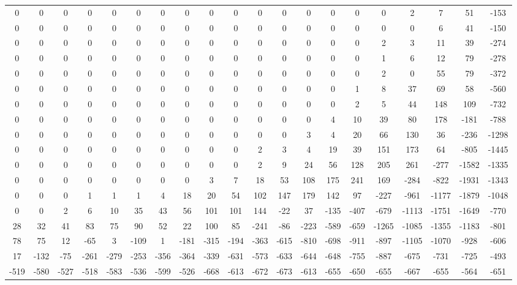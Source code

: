  \begin{tabular}{ | * {20}{c} | } 
0 & 0 & 0 & 0 & 0 & 0 & 0 & 0 & 0 & 0 & 0 & 0 & 0 & 0 & 0 & 0 & 2 & 7 & 51 & -153 \\ 
0 & 0 & 0 & 0 & 0 & 0 & 0 & 0 & 0 & 0 & 0 & 0 & 0 & 0 & 0 & 0 & 0 & 6 & 41 & -150 \\ 
0 & 0 & 0 & 0 & 0 & 0 & 0 & 0 & 0 & 0 & 0 & 0 & 0 & 0 & 0 & 2 & 3 & 11 & 39 & -274 \\ 
0 & 0 & 0 & 0 & 0 & 0 & 0 & 0 & 0 & 0 & 0 & 0 & 0 & 0 & 0 & 1 & 6 & 12 & 79 & -278 \\ 
0 & 0 & 0 & 0 & 0 & 0 & 0 & 0 & 0 & 0 & 0 & 0 & 0 & 0 & 0 & 2 & 0 & 55 & 79 & -372 \\ 
0 & 0 & 0 & 0 & 0 & 0 & 0 & 0 & 0 & 0 & 0 & 0 & 0 & 0 & 1 & 8 & 37 & 69 & 58 & -560 \\ 
0 & 0 & 0 & 0 & 0 & 0 & 0 & 0 & 0 & 0 & 0 & 0 & 0 & 0 & 2 & 5 & 44 & 148 & 109 & -732 \\ 
0 & 0 & 0 & 0 & 0 & 0 & 0 & 0 & 0 & 0 & 0 & 0 & 0 & 4 & 10 & 39 & 80 & 178 & -181 & -788 \\ 
0 & 0 & 0 & 0 & 0 & 0 & 0 & 0 & 0 & 0 & 0 & 0 & 3 & 4 & 20 & 66 & 130 & 36 & -236 & -1298 \\ 
0 & 0 & 0 & 0 & 0 & 0 & 0 & 0 & 0 & 0 & 2 & 3 & 4 & 19 & 39 & 151 & 173 & 64 & -805 & -1445 \\ 
0 & 0 & 0 & 0 & 0 & 0 & 0 & 0 & 0 & 0 & 2 & 9 & 24 & 56 & 128 & 205 & 261 & -277 & -1582 & -1335 \\ 
0 & 0 & 0 & 0 & 0 & 0 & 0 & 0 & 3 & 7 & 18 & 53 & 108 & 175 & 241 & 169 & -284 & -822 & -1931 & -1343 \\ 
0 & 0 & 0 & 1 & 1 & 1 & 4 & 18 & 20 & 54 & 102 & 147 & 179 & 142 & 97 & -227 & -961 & -1177 & -1879 & -1048 \\ 
0 & 0 & 2 & 6 & 10 & 35 & 43 & 56 & 101 & 101 & 144 & -22 & 37 & -135 & -407 & -679 & -1113 & -1751 & -1649 & -770 \\ 
28 & 32 & 41 & 83 & 75 & 90 & 52 & 22 & 100 & 85 & -241 & -86 & -223 & -589 & -659 & -1265 & -1085 & -1355 & -1183 & -801 \\ 
78 & 75 & 12 & -65 & 3 & -109 & 1 & -181 & -315 & -194 & -363 & -615 & -810 & -698 & -911 & -897 & -1105 & -1070 & -928 & -606 \\ 
17 & -132 & -75 & -261 & -279 & -253 & -356 & -364 & -339 & -631 & -573 & -633 & -644 & -648 & -755 & -887 & -675 & -731 & -725 & -493 \\ 
-519 & -580 & -527 & -518 & -583 & -536 & -599 & -526 & -668 & -613 & -672 & -673 & -613 & -655 & -650 & -655 & -667 & -655 & -564 & -651 \\ 
 \end{tabular} 
